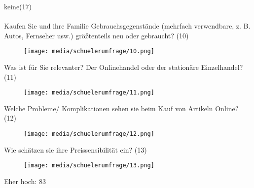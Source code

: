 keine(17)\\\\
\fi
\noindent Kaufen Sie und ihre Familie Gebrauchsgegenstände (mehrfach verwendbare, z. B. Autos, Fernseher usw.) größtenteils neu oder gebraucht? (10)\\

\begin{figure}[H]
    \begin{center}
        \texttt{[image: media/schuelerumfrage/10.png]}
    \end{center}
\end{figure}
\iffalse
neu: 129

gebraucht: 18\\\\
\fi
\newpage\noindent Was ist für Sie relevanter? Der Onlinehandel oder der stationäre Einzelhandel? (11)\\

\begin{figure}[H]
    \begin{center}
        \texttt{[image: media/schuelerumfrage/11.png]}
    \end{center}
\end{figure}
\iffalse
Onlinehandel: 61 

Offlinehandel: 76\\\\
\fi
\newpage\noindent Welche Probleme/ Komplikationen sehen sie beim Kauf von Artikeln Online? (12)
\begin{figure}[H]
    \begin{center}
        \texttt{[image: media/schuelerumfrage/12.png]}
    \end{center}
\end{figure}
\iffalse
keine(10), Betrug(37), Rückgabeprobleme(11), schlechter Produktzustand/ Qualität(34), ungenügende/falsche Produktinformationen(22), Mail/ Post-Spam(2), Versandprobleme(35), Umweltproblematik(5), Größe von Bekleidung(12), Schädigung des Einzelhandels(1), keine Beratung(3)\\\\
\fi
\noindent Wie schätzen sie ihre Preissensibilität ein? (13)\\
 
\begin{figure}[H]
    \begin{center}
        \texttt{[image: media/schuelerumfrage/13.png]}
    \end{center}
\end{figure} 
\iffalse
Eher hoch: 83

